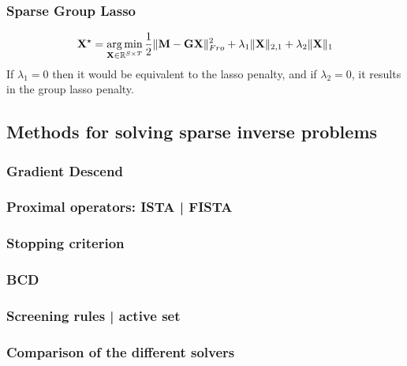 \subsubsection*{Sparse Group Lasso}
\begin{equation} \label{eq_sglasso}
	\mathbf{X}^\star = \mathop{\mathrm{arg}\,\mathrm{min}}_{\mathbf{X}\in\mathbb{R}^{S\times T}}\frac{1}{2}\|\mathbf{M}-\mathbf{GX}\|_{Fro}^2 + \lambda_1\|\mathbf{X}\|_{2,1} + \lambda_2\|\mathbf{X}\|_1
\end{equation}
If $\lambda_1=0$ then it would be equivalent to the lasso penalty, and if $\lambda_2=0$, it results in the group lasso penalty.
\endadjustwidth

\subsection{Methods for solving sparse inverse problems}
\subsubsection*{Gradient Descend}
\subsubsection*{Proximal operators: ISTA | FISTA}
\subsubsection*{Stopping criterion}
\subsubsection*{BCD}
\subsubsection*{Screening rules | active set}
\subsubsection*{Comparison of the different solvers}

